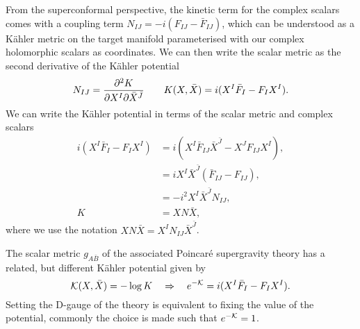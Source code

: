 From the superconformal perspective, the kinetic term for the complex scalars comes with a coupling term $N_{IJ} = -i(F_{IJ} - \bar{F}_{IJ})$, which can be understood as a K\"ahler metric on the target manifold parameterised with our complex holomorphic scalars as coordinates. We can then write the scalar metric as the second derivative of the K\"ahler potential
\begin{equation}
\label{eq:scalarmetric}
    N_{IJ} = \frac{\partial ^2 K}{\partial X^I \partial \bar{X}^{\bar{J}}} \qquad K(X,\bar{X}) = i(X^I \bar{F}_I - F_I X^I).
\end{equation}
We can write the K\"ahler potential in terms of the scalar metric and complex scalars
\begin{equation*}
    \begin{aligned}
            i(X^I \bar{F}_I - F_I X^I) &= i(X^I \bar{F}_{IJ} \bar{X}^{\bar{J}} - X^J F_{IJ} X^I), \\
            &= iX^I\bar{X}^{\bar{J}}( \bar{F}_{IJ} - F_{IJ}),\\
            &= -i^2X^I\bar{X}^{\bar{J}}  N_{IJ} ,\\
            K &= XN\bar{X},
    \end{aligned}
\end{equation*}
where we use the notation $XN\bar{X} = X^I N_{IJ}\bar{X}^{\bar{J}}$. 

The scalar metric $g_{A\bar{B}}$ of the associated Poincar\'e supergravity theory has a related, but different K\"ahler potential given by
\begin{equation}
    {\cal K}(X,\bar{X}) = -\log K \quad \Rightarrow \quad e^{-{\cal K}} = i(X^I \bar{F}_I - F_I X^I).
\end{equation}
Setting the D-gauge of the theory is equivalent to fixing the value of the potential, commonly the choice is made such that $e^{-{\cal K}} = 1$. 

